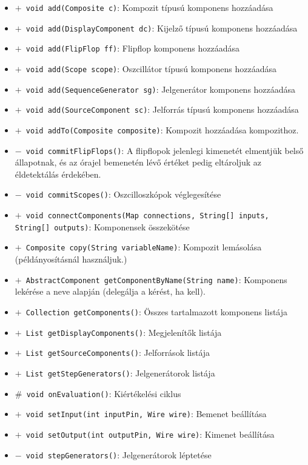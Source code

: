 \begin{itemize}
\begin{itemize}
	\item[] \texttt{$+$ void add(Composite c)}: Kompozit típusú komponens hozzáadása
	\item[] \texttt{$+$ void add(DisplayComponent dc)}: Kijelző típusú komponens hozzáadása
	\item[] \texttt{$+$ void add(FlipFlop ff)}: Flipflop komponens hozzáadása
	\item[] \texttt{$+$ void add(Scope scope)}: Oszcillátor típusú komponens hozzáadása
	\item[] \texttt{$+$ void add(SequenceGenerator sg)}: Jelgenerátor komponens hozzáadása
	\item[] \texttt{$+$ void add(SourceComponent sc)}: Jelforrás típusú komponens hozzáadása
	\item[] \texttt{$+$ void addTo(Composite composite)}: Kompozit hozzáadása kompozithoz.
	\item[] \texttt{$-$ void commitFlipFlops()}: A flipflopok jelenlegi kimenetét elmentjük belső állapotnak, és az órajel  bemenetén lévő értéket pedig eltároljuk az éldetektálás érdekében.
	\item[] \texttt{$-$ void commitScopes()}: Oszcilloszkópok véglegesítése
	\item[] \texttt{$+$ void connectComponents(Map connections, String[] inputs, String[] outputs)}: Komponensek összekötése
	\item[] \texttt{$+$ Composite copy(String variableName)}: Kompozit lemásolása (példányosításnál használjuk.)
	\item[] \texttt{$+$ AbstractComponent getComponentByName(String name)}: Komponens lekérése a neve alapján (delegálja a kérést, ha kell).
	\item[] \texttt{$+$ Collection getComponents()}: Összes tartalmazott komponens listája
	\item[] \texttt{$+$ List getDisplayComponents()}: Megjelenítők listája
	\item[] \texttt{$+$ List getSourceComponents()}: Jelforrások listája
	\item[] \texttt{$+$ List getStepGenerators()}: Jelgenerátorok listája
	\item[] \texttt{$\#$ void onEvaluation()}: Kiértékelési ciklus
	\item[] \texttt{$+$ void setInput(int inputPin, Wire wire)}: Bemenet beállítása
	\item[] \texttt{$+$ void setOutput(int outputPin, Wire wire)}: Kimenet beállítása
	\item[] \texttt{$-$ void stepGenerators()}: Jelgenerátorok léptetése
\end{itemize}
\end{itemize}

